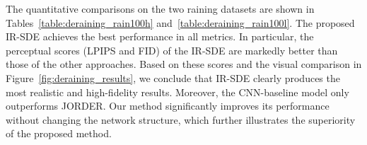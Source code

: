 \documentclass{article}
\theoremstyle{plain}
\theoremstyle{definition}
\theoremstyle{remark}
\begin{document}
The quantitative comparisons on the two raining datasets are shown in Tables~\ref{table:deraining_rain100h} and~\ref{table:deraining_rain100l}.  The proposed IR-SDE achieves the best performance in all metrics. In particular, the perceptual scores (LPIPS and FID) of the IR-SDE are markedly better than those of the other approaches. Based on these scores and the visual comparison in Figure~\ref{fig:deraining_results}, we conclude that IR-SDE clearly produces the most realistic and high-fidelity results. Moreover, the CNN-baseline model only outperforms JORDER. Our method significantly improves its performance without changing the network structure, which further illustrates the superiority of the proposed method.


\begin{table}[t]
\vspace{-2.0mm}
\caption{Quantitative comparison between the proposed IR-SDE with other image deblurring approaches on the GoPro test set.}
\label{table:deblurring}
\vskip 0.05in
\begin{center}
\begin{small}
\begin{sc}
\end{sc}
\end{small}
\end{center}
\vskip -0.1in
\end{table}
\end{document}
